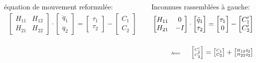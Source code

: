 \documentclass[10pt]{beamer}
\begin{document}
\begin{frame}
	\begin{columns}[T]
	\begin{column}{.5\textwidth}\footnotesize
	\begin{alertblock}{équation de mouvement reformulée:}
	  \begin{align}
	  	\begin{bmatrix}
		  H_{11} & H_{12} \\
		  H_{21} & H_{22}
		\end{bmatrix} 
		\cdot
		\begin{bmatrix}
		  \ddot{q}_{1} \\
		  \ddot{q}_{2}
		\end{bmatrix} 
		= 
		\begin{bmatrix}
		  \tau_{1} \\
		  \tau_{2}
		\end{bmatrix} 
		-
		\begin{bmatrix}
		  C_{1} \\
		  C_{2}
		\end{bmatrix} \label{equ_local_eqMvt_2}
		\end{align}
	\end{alertblock}
	\end{column}

	\begin{column}{.5\textwidth}\footnotesize
	\begin{alertblock}{Inconnues rassemblées à gauche:}
		\begin{align}
		\begin{bmatrix}
		  H_{11} & 0 \\
		  H_{21} &  -I
		\end{bmatrix} 
		\cdot
		\begin{bmatrix}
		  \ddot{q}_1 \\
		  \tau_2
		\end{bmatrix} 
		=
		\begin{bmatrix}
		  \tau_1 \\
		  0
		\end{bmatrix} 
		-
		\begin{bmatrix}
		  C'_{1} \\
		  C'_{2}
		\end{bmatrix} \label{equ_equationMvt_dynHyb2} \\
		\notag \\
		{\tiny \textnormal{Avec} \qquad
		\begin{bmatrix}
		  C'_{1} \\
		  C'_{2}
		\end{bmatrix}
		=
		\begin{bmatrix}
		  C_{1} \\
		  C_{2}
		\end{bmatrix}
		+
		\begin{bmatrix}
		  H_{12} \ddot{q}_2 \\
		  H_{22} \ddot{q}_2
		\end{bmatrix}} \label{equ_cPrime}
		\end{align}
	\end{alertblock}
	\end{column}
	\end{columns}
  
\end{frame}
\end{document}

